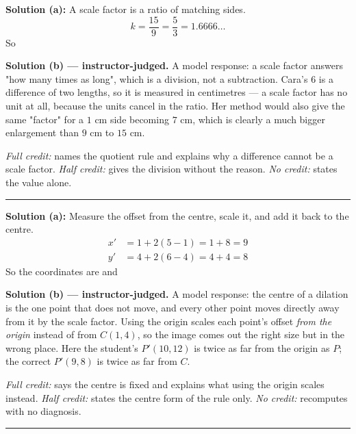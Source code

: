 \documentclass[12pt]{article}
\begin{document}

\textbf{Solution (a):} A scale factor is a ratio of matching sides.
\[ k = \frac{15}{9} = \frac{5}{3} = 1.6666\ldots \]
So 

\textbf{Solution (b) --- instructor-judged.} A model response: a scale factor answers "how many times as long", which is a division, not a subtraction. Cara's $6$ is a difference of two lengths, so it is measured in centimetres --- a scale factor has no unit at all, because the units cancel in the ratio. Her method would also give the same "factor" for a $1$ cm side becoming $7$ cm, which is clearly a much bigger enlargement than $9$ cm to $15$ cm.

\emph{Full credit:} names the quotient rule and explains why a difference cannot be a scale factor. \emph{Half credit:} gives the division without the reason. \emph{No credit:} states the value alone.

\vspace{0.2cm}\noindent\rule{\linewidth}{0.2pt}


\textbf{Solution (a):} Measure the offset from the centre, scale it, and add it back to the centre.
\begin{align*}
  x' &= 1 + 2(5 - 1) = 1 + 8 = 9 \\
  y' &= 4 + 2(6 - 4) = 4 + 4 = 8
\end{align*}
So the coordinates are  and 

\textbf{Solution (b) --- instructor-judged.} A model response: the centre of a dilation is the one point that does not move, and every other point moves directly away from it by the scale factor. Using the origin scales each point's offset \emph{from the origin} instead of from $C(1, 4)$, so the image comes out the right size but in the wrong place. Here the student's $P'(10, 12)$ is twice as far from the origin as $P$; the correct $P'(9, 8)$ is twice as far from $C$.

\emph{Full credit:} says the centre is fixed and explains what using the origin scales instead. \emph{Half credit:} states the centre form of the rule only. \emph{No credit:} recomputes with no diagnosis.

\vspace{0.2cm}\noindent\rule{\linewidth}{0.2pt}
\end{document}
